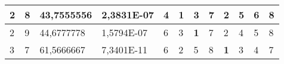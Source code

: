 \documentclass[conference]{IEEEtran}
\begin{document}
\begin{table*}[]
\begin{tabular}{|llll|llllllll|}
\multicolumn{1}{|l|}{2}                                                     & \multicolumn{1}{l|}{8}                                                        & \multicolumn{1}{l|}{43,7555556}                                                   & 2,3831E-07                     & \multicolumn{1}{l|}{4}                                                  & \multicolumn{1}{l|}{\textbf{1}}                                         & \multicolumn{1}{l|}{3}                                                  & \multicolumn{1}{l|}{7}                                                  & \multicolumn{1}{l|}{2}                                                  & \multicolumn{1}{l|}{5}                                                  & \multicolumn{1}{l|}{6}                                                  & 8                          \\ \hline
\multicolumn{1}{|l|}{2}                                                     & \multicolumn{1}{l|}{9}                                                        & \multicolumn{1}{l|}{44,6777778}                                                   & 1,5794E-07                     & \multicolumn{1}{l|}{6}                                                  & \multicolumn{1}{l|}{3}                                                  & \multicolumn{1}{l|}{\textbf{1}}                                         & \multicolumn{1}{l|}{7}                                                  & \multicolumn{1}{l|}{2}                                                  & \multicolumn{1}{l|}{4}                                                  & \multicolumn{1}{l|}{5}                                                  & 8                          \\ \hline
\multicolumn{1}{|l|}{3}                                                     & \multicolumn{1}{l|}{7}                                                        & \multicolumn{1}{l|}{61,5666667}                                                   & 7,3401E-11                     & \multicolumn{1}{l|}{6}                                                  & \multicolumn{1}{l|}{2}                                                  & \multicolumn{1}{l|}{5}                                                  & \multicolumn{1}{l|}{8}                                                  & \multicolumn{1}{l|}{\textbf{1}}                                         & \multicolumn{1}{l|}{3}                                                  & \multicolumn{1}{l|}{4}                                                  & 7                          \\ \hline

\end{tabular}
\end{table*}
\end{document}
